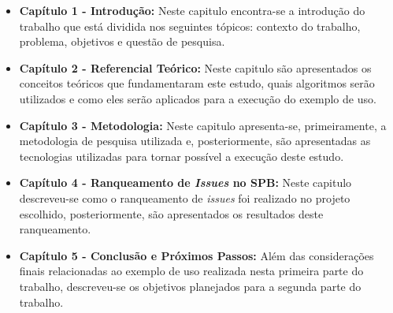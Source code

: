 \begin{itemize}
    \item \textbf{Capítulo 1 - Introdução:} Neste capitulo encontra-se a introdução do trabalho que está dividida nos seguintes tópicos: contexto do trabalho, problema, objetivos e questão de pesquisa.
    \item \textbf{Capítulo 2 - Referencial Teórico:} Neste capitulo são apresentados os conceitos teóricos que fundamentaram este estudo, quais algoritmos serão utilizados e como eles serão aplicados para a execução do exemplo de uso.
    \item \textbf{Capítulo 3 - Metodologia:} Neste capitulo apresenta-se, primeiramente, a metodologia de pesquisa utilizada e, posteriormente, são apresentadas as tecnologias utilizadas para tornar possível a execução deste estudo.
    \item \textbf{Capítulo 4 - Ranqueamento de \textit{Issues} no SPB:} Neste capitulo descreveu-se como o ranqueamento de \textit{issues} foi realizado no projeto escolhido, posteriormente, são apresentados os resultados deste ranqueamento.
    \item \textbf{Capítulo 5 - Conclusão e Próximos Passos:} Além das considerações finais relacionadas ao exemplo de uso realizada nesta primeira parte do trabalho, descreveu-se os objetivos planejados para a segunda parte do trabalho.
\end{itemize}
